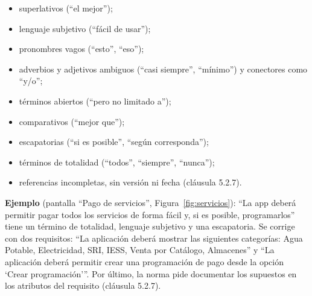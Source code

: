 \documentclass[11pt,a4paper]{article}
\begin{document}
\begin{itemize}
	\item superlativos (“el mejor”);
	\item lenguaje subjetivo (“fácil de usar”);
	\item pronombres vagos (“esto”, “eso”);
	\item adverbios y adjetivos ambiguos (“casi siempre”, “mínimo”) y conectores como “y/o”;
	\item términos abiertos (“pero no limitado a”);
	\item comparativos (“mejor que”);
	\item escapatorias (“si es posible”, “según corresponda”);
	\item términos de totalidad (“todos”, “siempre”, “nunca”);
	\item referencias incompletas, sin versión ni fecha (cláusula 5.2.7).
\end{itemize}

\textbf{Ejemplo} (pantalla “Pago de servicios”, Figura~\ref{fig:servicios}): “La app deberá permitir pagar todos los servicios de forma fácil y, si es posible, programarlos” tiene un término de totalidad, lenguaje subjetivo y una escapatoria. Se corrige con dos requisitos: “La aplicación deberá mostrar las siguientes categorías: Agua Potable, Electricidad, SRI, IESS, Venta por Catálogo, Almacenes” y “La aplicación deberá permitir crear una programación de pago desde la opción ‘Crear programación’”. Por último, la norma pide documentar los supuestos en los atributos del requisito (cláusula 5.2.7).

\end{document}
